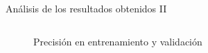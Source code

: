 \begin{frame}[fragile]{Análisis de los resultados obtenidos II}
\begin{columns}
\begin{column}[t]{0.5\textwidth}
\begin{figure}[t!]
			\vspace*{-10pt}
			\caption{Precisión en entrenamiento y validación}
			\label{fig: results_acc_compa}
		\end{figure}
	\end{column}
\end{columns}
\end{frame}